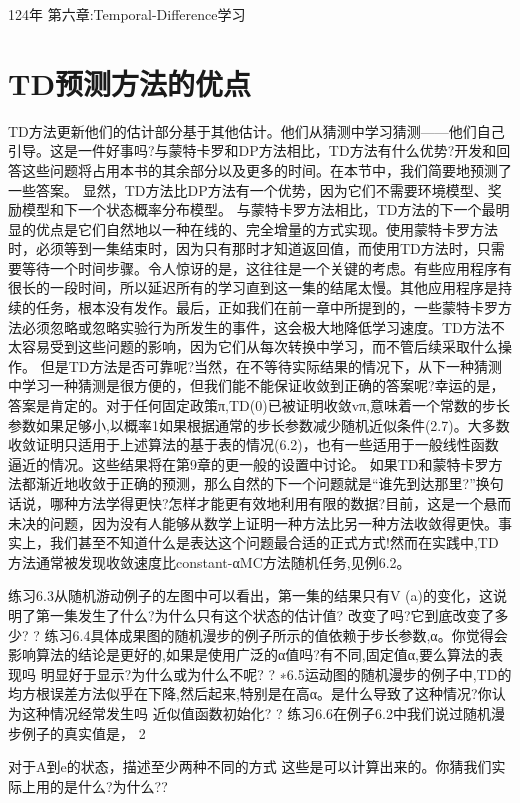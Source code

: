 124年 					第六章:Temporal-Difference学习


\section{TD预测方法的优点}

TD方法更新他们的估计部分基于其他估计。他们从猜测中学习猜测——他们自己引导。这是一件好事吗?与蒙特卡罗和DP方法相比，TD方法有什么优势?开发和回答这些问题将占用本书的其余部分以及更多的时间。在本节中，我们简要地预测了一些答案。
显然，TD方法比DP方法有一个优势，因为它们不需要环境模型、奖励模型和下一个状态概率分布模型。
与蒙特卡罗方法相比，TD方法的下一个最明显的优点是它们自然地以一种在线的、完全增量的方式实现。使用蒙特卡罗方法时，必须等到一集结束时，因为只有那时才知道返回值，而使用TD方法时，只需要等待一个时间步骤。令人惊讶的是，这往往是一个关键的考虑。有些应用程序有很长的一段时间，所以延迟所有的学习直到这一集的结尾太慢。其他应用程序是持续的任务，根本没有发作。最后，正如我们在前一章中所提到的，一些蒙特卡罗方法必须忽略或忽略实验行为所发生的事件，这会极大地降低学习速度。TD方法不太容易受到这些问题的影响，因为它们从每次转换中学习，而不管后续采取什么操作。
但是TD方法是否可靠呢?当然，在不等待实际结果的情况下，从下一种猜测中学习一种猜测是很方便的，但我们能不能保证收敛到正确的答案呢?幸运的是，答案是肯定的。对于任何固定政策π,TD(0)已被证明收敛vπ,意味着一个常数的步长参数如果足够小,以概率1如果根据通常的步长参数减少随机近似条件(2.7)。大多数收敛证明只适用于上述算法的基于表的情况(6.2)，也有一些适用于一般线性函数逼近的情况。这些结果将在第9章的更一般的设置中讨论。
如果TD和蒙特卡罗方法都渐近地收敛于正确的预测，那么自然的下一个问题就是“谁先到达那里?”换句话说，哪种方法学得更快?怎样才能更有效地利用有限的数据?目前，这是一个悬而未决的问题，因为没有人能够从数学上证明一种方法比另一种方法收敛得更快。事实上，我们甚至不知道什么是表达这个问题最合适的正式方式!然而在实践中,TD方法通常被发现收敛速度比constant-αMC方法随机任务,见例6.2。

练习6.3从随机游动例子的左图中可以看出，第一集的结果只有V (a)的变化，这说明了第一集发生了什么?为什么只有这个状态的估计值?
改变了吗?它到底改变了多少? 					?
练习6.4具体成果图的随机漫步的例子所示的值依赖于步长参数,α。你觉得会影响算法的结论是更好的,如果是使用广泛的α值吗?有不同,固定值α,要么算法的表现吗
明显好于显示?为什么或为什么不呢? 					?
∗6.5运动图的随机漫步的例子中,TD的均方根误差方法似乎在下降,然后起来,特别是在高α。是什么导致了这种情况?你认为这种情况经常发生吗
近似值函数初始化? 					?
练习6.6在例子6.2中我们说过随机漫步例子的真实值是，
2

对于A到e的状态，描述至少两种不同的方式
这些是可以计算出来的。你猜我们实际上用的是什么?为什么??


